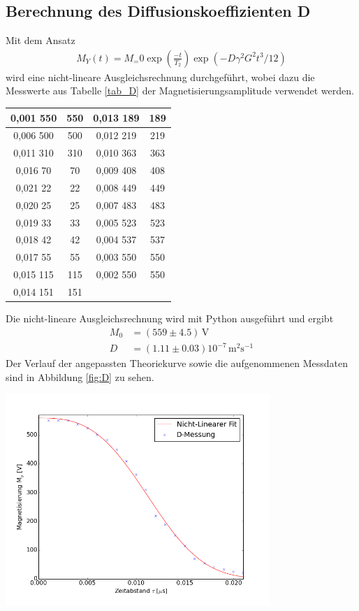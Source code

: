 \documentclass[]{scrartcl}
\begin{document}
\subsection{Berechnung des Diffusionskoeffizienten D}
Mit dem Ansatz
\begin{align*}
M_Y(t)=M_=0\exp\left( \frac{-t}{T_2}\right) \exp(-D\gamma^2G^2t^3/12)
\end{align*}
wird eine nicht-lineare Ausgleichsrechnung durchgeführt, wobei dazu die Messwerte aus Tabelle \ref{tab_D} der Magnetisierungsamplitude verwendet werden. \\
\begin{center}
	\begin{tabular}{|c|c|c|c|}
		\hline	0,001	550	&	550	&	0,013	189	&	189	\\
		\hline	0,006	500	&	500	&	0,012	219	&	219	\\
		\hline	0,011	310	&	310	&	0,010	363	&	363	\\
		\hline	0,016	70	&	70	&	0,009	408	&	408	\\
		\hline	0,021	22	&	22	&	0,008	449	&	449	\\
		\hline	0,020	25	&	25	&	0,007	483	&	483	\\
		\hline	0,019	33	&	33	&	0,005	523	&	523	\\
		\hline	0,018	42	&	42	&	0,004	537	&	537	\\
		\hline	0,017	55	&	55	&	0,003	550	&	550	\\
		\hline	0,015	115	&	115	&	0,002	550	&	550	\\
		\hline	0,014	151	&	151	&		&		\\
	\end{tabular}
	\label{tab_D}
\end{center}
Die nicht-lineare Ausgleichsrechnung wird mit Python ausgeführt und ergibt 
\begin{align*}
M_0&=(559 \pm 4.5)\,\text{V}\\
D&=(1.11 \pm 0.03) 10^{-7}\,\text{m$^2$s$^{-1}$}
\end{align*}
Der Verlauf der angepassten Theoriekurve sowie die aufgenommenen Messdaten sind in Abbildung \ref{fig:D} zu sehen.
\begin{center}
	\includegraphics[width=10cm]{images/plotD.png}
	\label{fig:D}
\end{center}
\end{document}
